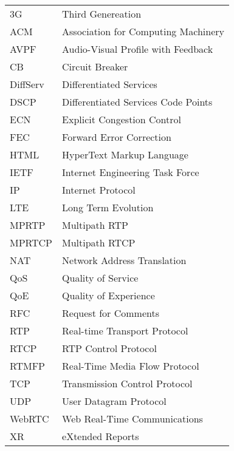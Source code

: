 \begin{longtable}{ll}
3G		& Third Genereation \\
ACM		& Association for Computing Machinery \\
AVPF	& Audio-Visual Profile with Feedback \\
CB		& Circuit Breaker \\
DiffServ	& Differentiated Services \\
DSCP 	& Differentiated Services Code Points \\
ECN		& Explicit Congestion Control \\
FEC		& Forward Error Correction \\
HTML	& HyperText Markup Language \\
IETF	& Internet Engineering Task Force \\
IP		& Internet Protocol \\
LTE 	& Long Term Evolution \\
MPRTP 	& Multipath RTP \\
MPRTCP 	& Multipath RTCP \\
NAT		& Network Address Translation \\
QoS		& Quality of Service \\
QoE		& Quality of Experience \\
RFC 	& Request for Comments \\
RTP 	& Real-time Transport Protocol \\
RTCP 	& RTP Control Protocol \\
RTMFP	& Real-Time Media Flow Protocol \\
TCP		& Transmission Control Protocol \\
UDP		& User Datagram Protocol \\
WebRTC 	& Web Real-Time Communications \\
XR		& eXtended Reports \\
\end{longtable}

